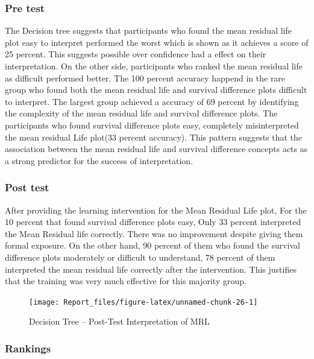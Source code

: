 \documentclass{article}
\begin{document}
\subsubsection{Pre test}\label{pre-test}

The Decision tree suggests that participants who found the mean residual life plot easy to interpret performed the worst which is shown as it achieves a score of 25 percent. This suggests possible over confidence had a effect on their interpretation. On the other side, participants who ranked the mean residual life as difficult performed better. The 100 percent accuracy happend in the rare group who found both the mean residual life and survival difference plots difficult to interpret. The largest group achieved a accuracy of 69 percent by identifying the complexity of the mean residual life and survival difference plots. The participants who found survival difference plots easy, completely misinterpreted the mean residual Life plot(33 percent accuracy). This pattern suggests that the association between the mean residual life and survival difference concepts acts as a strong predictor for the success of interpretation.

\subsubsection{Post test}\label{post-test}

After providing the learning intervention for the Mean Residual Life plot, For the 10 percent that found survival difference plots easy, Only 33 percent interpreted the Mean Residual life correctly. There was no improvement despite giving them formal exposure. On the other hand, 90 percent of them who found the survival difference plots moderately or difficult to understand, 78 percent of them interpreted the mean residual life correctly after the intervention. This justifies that the training was very much effective for this majority group.

\begin{figure}

{\centering \texttt{[image: Report\_files/figure-latex/unnamed-chunk-26-1]} 

}

\caption{Decision Tree – Post-Test Interpretation of MRL}\label{fig:unnamed-chunk-26}
\end{figure}

\subsubsection{Rankings}\label{rankings}
\end{document}
